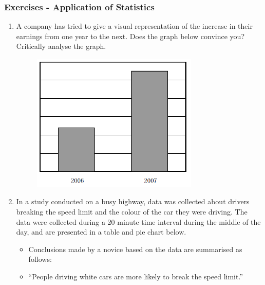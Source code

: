 \begin{description}[noitemsep]
\begin{description}[noitemsep]
            \subsubsection{ Exercises - Application of Statistics}
            \nopagebreak
        \label{m39404*id216093}\begin{enumerate}[noitemsep, label=\textbf{\arabic*}. ] 
            \label{m39404*uid113}\item A company has tried to give a visual representation of the increase in their earnings from one year to the next. Does the graph below convince you? Critically analyse the graph.
    \setcounter{subfigure}{0}
	\begin{figure}[H] %
    \begin{center}
    \label{m39404*id216113!!!underscore!!!media}\label{m39404*id216113!!!underscore!!!printimage}\includegraphics[width=300px]{col11306.imgs/m39404_MG10C16_011.png} %
      \vspace{2pt}
    \vspace{.1in}
    \end{center}
 \end{figure}               \label{m39404*uid114}\item In a study conducted on a busy highway, data was collected about drivers breaking the speed limit and the colour of the car they were driving. The data were collected during a 20 minute time interval during the middle of the day, and are presented in a table and pie chart below.
\label{m39404*id216251}\begin{itemize}[noitemsep]
            \label{m39404*uid115}\item Conclusions made by a novice based on the data are summarised as follows:
\label{m39404*uid116}\item ``People driving white cars are more likely to break the speed limit.''

\end{itemize}
\end{enumerate}
\end{description}
\end{description}
